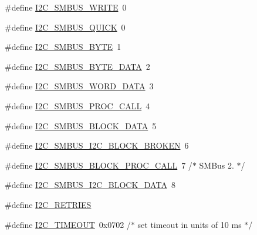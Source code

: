 \begin{DoxyCompactItemize}
\#define \hyperlink{i2c-tools-3_81_81_2include_2linux_2i2c-dev_8h_ac4d2a9af170b85b33c640c811f240c76}{I2\+C\+\_\+\+S\+M\+B\+U\+S\+\_\+\+W\+R\+I\+T\+E}~0
\item 
\#define \hyperlink{i2c-tools-3_81_81_2include_2linux_2i2c-dev_8h_a94760c9e3bb58f5535578eb52a0ffc0c}{I2\+C\+\_\+\+S\+M\+B\+U\+S\+\_\+\+Q\+U\+I\+C\+K}~0
\item 
\#define \hyperlink{i2c-tools-3_81_81_2include_2linux_2i2c-dev_8h_a8006fa66a9d9224959fb8337a365a12a}{I2\+C\+\_\+\+S\+M\+B\+U\+S\+\_\+\+B\+Y\+T\+E}~1
\item 
\#define \hyperlink{i2c-tools-3_81_81_2include_2linux_2i2c-dev_8h_a3d7320d4d3f8b109344ee08feab0e533}{I2\+C\+\_\+\+S\+M\+B\+U\+S\+\_\+\+B\+Y\+T\+E\+\_\+\+D\+A\+T\+A}~2
\item 
\#define \hyperlink{i2c-tools-3_81_81_2include_2linux_2i2c-dev_8h_abd0ad56a944b1a95435d51cc54db36c4}{I2\+C\+\_\+\+S\+M\+B\+U\+S\+\_\+\+W\+O\+R\+D\+\_\+\+D\+A\+T\+A}~3
\item 
\#define \hyperlink{i2c-tools-3_81_81_2include_2linux_2i2c-dev_8h_a140bc92b58f10de5eb796ad71e8f0da2}{I2\+C\+\_\+\+S\+M\+B\+U\+S\+\_\+\+P\+R\+O\+C\+\_\+\+C\+A\+L\+L}~4
\item 
\#define \hyperlink{i2c-tools-3_81_81_2include_2linux_2i2c-dev_8h_a0253f81d1f2732492c1a05dc41094d12}{I2\+C\+\_\+\+S\+M\+B\+U\+S\+\_\+\+B\+L\+O\+C\+K\+\_\+\+D\+A\+T\+A}~5
\item 
\#define \hyperlink{i2c-tools-3_81_81_2include_2linux_2i2c-dev_8h_a36bcbcb9294695fddb8606a32cbedc9b}{I2\+C\+\_\+\+S\+M\+B\+U\+S\+\_\+\+I2\+C\+\_\+\+B\+L\+O\+C\+K\+\_\+\+B\+R\+O\+K\+E\+N}~6
\item 
\#define \hyperlink{i2c-tools-3_81_81_2include_2linux_2i2c-dev_8h_a187e1de23e9935885cdb94ee429a2eed}{I2\+C\+\_\+\+S\+M\+B\+U\+S\+\_\+\+B\+L\+O\+C\+K\+\_\+\+P\+R\+O\+C\+\_\+\+C\+A\+L\+L}~7		/$\ast$ S\+M\+Bus 2. $\ast$/
\item 
\#define \hyperlink{i2c-tools-3_81_81_2include_2linux_2i2c-dev_8h_aa5ecbb0ceaddcb905d68d366edfb026c}{I2\+C\+\_\+\+S\+M\+B\+U\+S\+\_\+\+I2\+C\+\_\+\+B\+L\+O\+C\+K\+\_\+\+D\+A\+T\+A}~8
\item 
\#define \hyperlink{i2c-tools-3_81_81_2include_2linux_2i2c-dev_8h_ae8b7ab32459314e0c0162974f2ce22e1}{I2\+C\+\_\+\+R\+E\+T\+R\+I\+E\+S}
\item 
\#define \hyperlink{i2c-tools-3_81_81_2include_2linux_2i2c-dev_8h_afa3215f0aa766367f5d34bee80929152}{I2\+C\+\_\+\+T\+I\+M\+E\+O\+U\+T}~0x0702	/$\ast$ set timeout in units of 10 ms $\ast$/
\item 

\end{DoxyCompactItemize}
